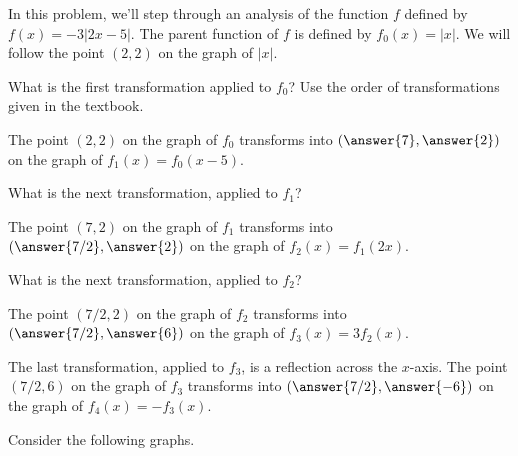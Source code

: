 \documentclass{ximera}
\author{Kenneth Berglund}
\begin{document}
In this problem, we'll step through an analysis of the function $f$ defined by $f(x) = -3|2x - 5|$. The parent function of $f$ is defined by $f_0(x) = |x|$. We will follow the point $(2, 2)$ on the graph of $|x|$. 
\begin{exercise}
What is the first transformation applied to $f_0$?  Use the order of transformations given in the textbook.
\begin{multipleChoice}
\end{multipleChoice}

\begin{exercise}
The point $(2,2)$ on the graph of $f_0$ transforms into $(\answer{7}, \answer{2})$ on the graph of $f_1(x) = f_0(x - 5)$. 

\begin{exercise}
What is the next transformation, applied to $f_1$?
\begin{multipleChoice}
\end{multipleChoice}

\begin{exercise}
The point $(7,2)$ on the graph of $f_1$ transforms into $(\answer{7/2}, \answer{2})$ on the graph of $f_2(x) = f_1\left(2x\right)$. 

\begin{exercise}
What is the next transformation, applied to $f_2$?
\begin{multipleChoice}
\end{multipleChoice}

\begin{exercise}
The point $(7/2, 2)$ on the graph of $f_2$ transforms into $(\answer{7/2}, \answer{6})$ on the graph of $f_3(x) = 3f_2\left(x\right)$. 

\begin{exercise}
The last transformation, applied to $f_3$, is a reflection across the $x$-axis. The point $(7/2,6)$ on the graph of $f_3$ transforms into $(\answer{7/2}, \answer{-6})$ on the graph of $f_4(x) = -f_3(x)$. 

\begin{exercise}
Consider the following graphs.


\end{exercise}
\end{exercise}
\end{exercise}
\end{exercise}
\end{exercise}
\end{exercise}
\end{exercise}
\end{exercise}
\end{document}

